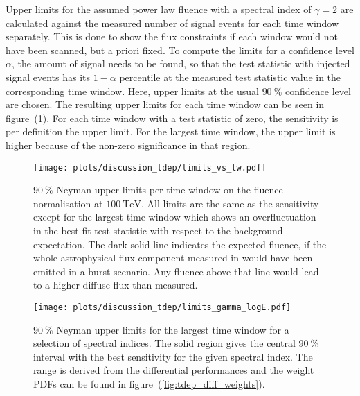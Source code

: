Upper limits for the assumed power law fluence with a spectral index of $\gamma=2$ are calculated against the measured number of signal events for each time window separately.
This is done to show the flux constraints if each window would not have been scanned, but a priori fixed.
To compute the limits for a confidence level $\alpha$, the amount of signal needs to be found, so that the test statistic with injected signal events has its $1-\alpha$ percentile at the measured test statistic value in the corresponding time window.
Here, upper limits at the usual $\SI{90}{\percent}$ confidence level are chosen.
The resulting upper limits for each time window can be seen in figure~(\ref{fig:tdep_limits_vs_tw}).
For each time window with a test statistic of zero, the sensitivity is per definition the upper limit.
For the largest time window, the upper limit is higher because of the non-zero significance in that region.

\begin{figure}[htpb]
  \centering
  \texttt{[image: plots/discussion\_tdep/limits\_vs\_tw.pdf]}
  \caption[Fluence limits for each time windows for the time-dependent analysis]{
    $\SI{90}{\percent}$ Neyman upper limits per time window on the fluence normalisation at $\SI{100}{\TeV}$.
    All limits are the same as the sensitivity except for the largest time window which shows an overfluctuation in the best fit test statistic with respect to the background expectation.
    The dark solid line indicates the expected fluence, if the whole astrophysical flux component measured in \cite{Haack:2017dxi} would have been emitted in a burst scenario.
    Any fluence above that line would lead to a higher diffuse flux than measured.
  }
  \label{fig:tdep_limits_vs_tw}
\end{figure}
\enlargethispage*{5cm}
\begin{figure}[htpb]
  \centering
  \texttt{[image: plots/discussion\_tdep/limits\_gamma\_logE.pdf]}
  \caption[Unbroken power-law fluence limits for the largest time window]{
    $\SI{90}{\percent}$ Neyman upper limits for the largest time window for a selection of spectral indices.
    The solid region gives the central $\SI{90}{\percent}$ interval with the best sensitivity for the given spectral index.
    The range is derived from the differential performances and the weight PDFs can be found in figure~(\ref{fig:tdep_diff_weights}).
  }
  \label{fig:tdep_limits_gamma_logE}
\end{figure}

